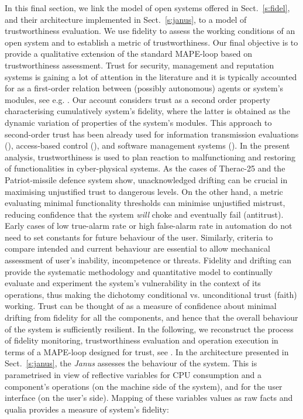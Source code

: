 \documentclass{article}
\begin{document}
In this final section, we link the model of open systems offered in Sect.~\ref{s:fidel}, and their architecture implemented in Sect.~\ref{s:janus}, to a model of trustworthiness evaluation. We use fidelity to assess the working conditions of an open system and to establish a metric of trustworthiness. Our final objective is to provide a qualitative extension of the standard MAPE-loop based on trustworthiness assessment. Trust for security, management and reputation systems is gaining a lot of attention in the literature and it is typically accounted for as a first-order relation between (possibly autonomous) agents or system's modules, see e.g. \cite{eps262294,ClarkeCX09,as-trust2011,5340804,journals/tdsc/YanP11}. Our account considers trust as a second order property characterising cumulatively system's fidelity, where the latter is obtained as the dynamic variation of properties of the system's modules. This approach to second-order trust has been already used for information transmission evaluations (\cite{primiero_taddeo}), access-based control (\cite{primiero_secureND}), and software management systems (\cite{primiero_NDC}). In the present analysis, trustworthiness is used to plan reaction to malfunctioning and restoring of functionalities in cyber-physical systems. As the cases of Therac-25 and the Patriot-missile defence system show, unacknowledged drifting can be crucial in maximising unjustified trust to dangerous levels. On the other hand, a metric evaluating minimal functionality thresholds can minimise unjustified mistrust, reducing confidence that the system \textit{will} choke and eventually fail (antitrust). Early cases of low true-alarm rate or high false-alarm rate in automation do not need to set constants for future behaviour of the user. Similarly, criteria to compare intended and current behaviour are essential to allow mechanical assessment of user's inability, incompetence or threats. Fidelity and drifting can provide the systematic methodology and quantitative model to continually evaluate and experiment the system's vulnerability in the context of its operations, thus making the dichotomy conditional vs. unconditional trust (faith) working. Trust can be thought of as a measure of confidence about minimal drifting from fidelity for all the components, and hence that the overall behaviour of the system is sufficiently resilient. In the following, we reconstruct the process of fidelity monitoring, trustworthiness evaluation and operation execution in terms of a MAPE-loop designed for trust, see \cite{MAPE}. In the architecture presented in Sect.~\ref{s:janus}, the \textit{Janus} assesses the behaviour of the system. This is parametrised in view of reflective variables for CPU consumption and a component's operations (on the machine side of the system), and for the user interface (on the user's side). Mapping of these variables values as raw facts and qualia provides a measure of system's fidelity:
\end{document}
